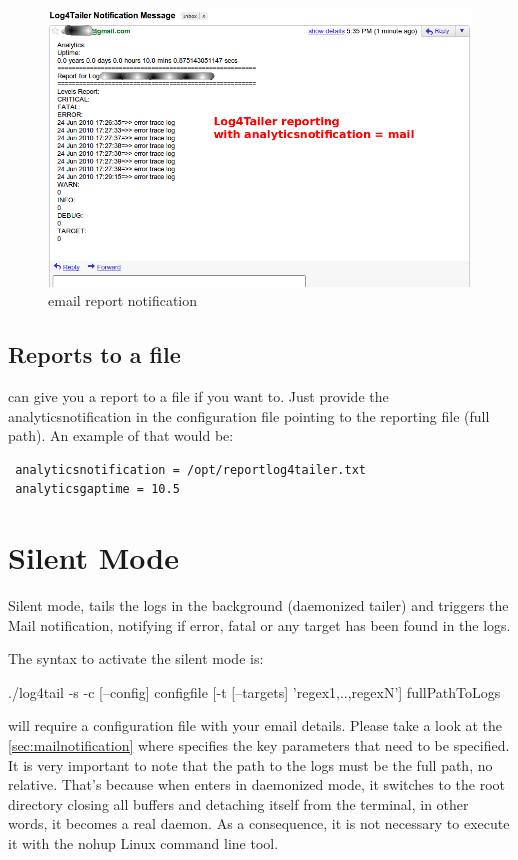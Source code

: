 \begin{figure}[ht]
\includegraphics[scale=0.50]{emailnotification.png}
\caption{\logftailer{} email report notification}\label{fig:emailnotification}
\end{figure}

\subsection{Reports to a file}
\logftailer{} can give you a report to a file if you want to. Just provide the
analyticsnotification in the configuration file pointing to the reporting file
(full path). An example of that would be:

\begin{config}
\begin{verbatim}
 analyticsnotification = /opt/reportlog4tailer.txt
 analyticsgaptime = 10.5
\end{verbatim}
\end{config}

\section{Silent Mode}
Silent mode, tails the logs in the background (daemonized tailer) and triggers
the Mail notification, notifying if error, fatal or any target has been found
in the logs. 

The syntax to activate the silent mode is:
\begin{cmd}
 ./log4tail -s -c [--config] configfile [-t [--targets] 'regex1,..,regexN'] fullPathToLogs
\end{cmd}

\logftailer{} will require a configuration file with your email details. Please
take a look at the \autoref{sec:mailnotification} where specifies the key
parameters that need to be specified. It is very important to note that the
path to the logs must be the full path, no relative. That's because when
\logftailer{} enters in daemonized mode, it switches to the root directory
closing all buffers and detaching itself from the terminal, in other words, it
becomes a real daemon. As a consequence, it is not necessary to execute it with
the nohup Linux command line tool.

